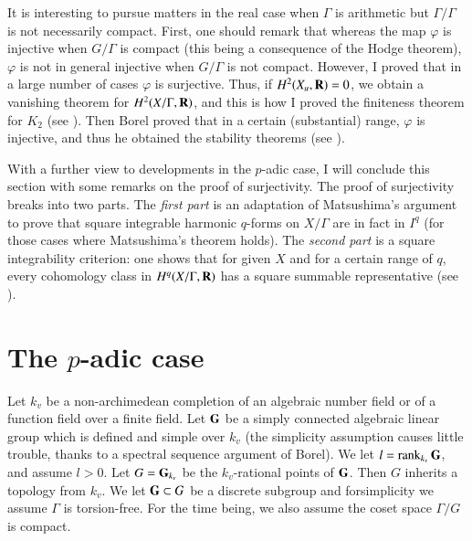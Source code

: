 It is interesting to pursue matters in the real case when $\Gamma$ is arithmetic but $\Gamma/\Gamma$ is not necessarily compact. First, one should remark that whereas the map $\varphi$ is injective when $G/\Gamma$ is compact (this being a consequence of the Hodge theorem), $\varphi$ is not in general injective when $G/\Gamma$ is not compact. However, I proved that in a large number of cases $\varphi$ is surjective. Thus, if $H^2 (X_u, \mathbf{R}) = 0$, we obtain a vanishing theorem for $H^2 (X/\Gamma,\mathbf{R})$, and this is how I proved the finiteness theorem for $K_2$ (see \cite{art3-key6}). Then Borel proved that in a certain (substantial) range, $\varphi$ is injective, and thus he obtained the stability theorems (see \cite{art3-key1}).

With a further view to developments in the $p$-adic case, I will conclude this section with some remarks on the proof of surjectivity. The proof of surjectivity breaks into two parts. The \textit{first part} is an adaptation of Matsushima's argument to prove that square integrable harmonic $q$-forms on $X/\Gamma$ are in fact in $I^q$ (for those cases where Matsushima's theorem holds). The \textit{second part} is a square integrability criterion: one shows that for given $X$ and for a certain range of $q$, every cohomology class in $H^q (X/\Gamma, \mathbf{R})$ has a square summable representative (see \cite{art3-key8}).

\section{The $p$-adic case}\label{art3-sec3}
Let $k_v$ be a non-archimedean completion of an algebraic number field or of a function field over a finite field. Let $\mathbf{G}$ be a simply connected algebraic linear group which is defined and simple over $k_v$ (the simplicity assumption causes little trouble, thanks to a spectral sequence argument of Borel). We let $l=\operatorname{rank}_{k_v} \mathbf{G}$, and assume $l> 0$. Let $G = \mathbf{G}_{k_v}$ be the $k_v$-rational points of $\mathbf{G}$. Then $G$ inherits a topology from $k_v$. We let $\mathbf{G} \subset G$ be a discrete subgroup and for\pageoriginale simplicity we assume $\Gamma$ is torsion-free. For the time being, we also assume the coset space $\Gamma/G$ is compact.

